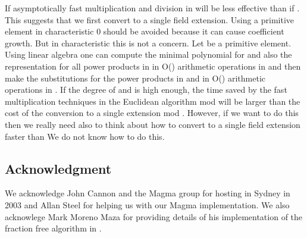 \documentclass[10pt]{article}
\begin{document}
If  asymptotically fast multiplication and division in  will
be less effective than if .  This suggests that we first convert
to a single field extension.  Using a primitive element in characteristic 0
should be avoided because it can cause coefficient growth.
But in characteristic  this is not a concern.
Let 
be a primitive element.  Using linear algebra one can compute the
minimal polynomial  for  and also the
representation for all  power products 
in  in O() arithmetic operations in 
and then make the substitutions for the power products in 
and  in O() arithmetic operations in .
If  the degree of  and  is high enough, the
time saved by the fast multiplication techniques in the Euclidean
algorithm mod  will be larger than the cost of the
conversion to a single extension mod .
However, if we want to do this then we really need also
to think about how to convert to a single field extension faster
than   We do not know how to do this.
 
\subsection*{Acknowledgment}
We acknowledge John Cannon and the Magma group for hosting
in Sydney in 2003 and Allan Steel for helping
us with our Magma implementation.
We also acknowlege Mark Moreno Maza for providing details of his implementation
of the fraction free algorithm in \cite{Maza}.
\end{document}
